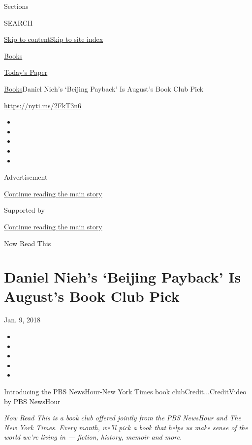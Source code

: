 Sections

SEARCH

\protect\hyperlink{site-content}{Skip to
content}\protect\hyperlink{site-index}{Skip to site index}

\href{https://www.nytimes3xbfgragh.onion/section/books}{Books}

\href{https://myaccount.nytimes3xbfgragh.onion/auth/login?response_type=cookie\&client_id=vi}{}

\href{https://www.nytimes3xbfgragh.onion/section/todayspaper}{Today's
Paper}

\href{/section/books}{Books}\textbar{}Daniel Nieh's `Beijing Payback' Is
August's Book Club Pick

\url{https://nyti.ms/2FkT3n6}

\begin{itemize}
\item
\item
\item
\item
\item
\end{itemize}

Advertisement

\protect\hyperlink{after-top}{Continue reading the main story}

Supported by

\protect\hyperlink{after-sponsor}{Continue reading the main story}

Now Read This

\hypertarget{daniel-niehs-beijing-payback-is-augusts-book-club-pick}{%
\section{Daniel Nieh's `Beijing Payback' Is August's Book Club
Pick}\label{daniel-niehs-beijing-payback-is-augusts-book-club-pick}}

Jan. 9, 2018

\begin{itemize}
\item
\item
\item
\item
\item
\end{itemize}

Introducing the PBS NewsHour-New York Times book
clubCredit...CreditVideo by PBS NewsHour

\emph{Now Read This is a book club offered jointly from the PBS NewsHour
and The New York Times. Every month, we'll pick a book that helps us
make sense of the world we're living in --- fiction, history, memoir and
more.}

